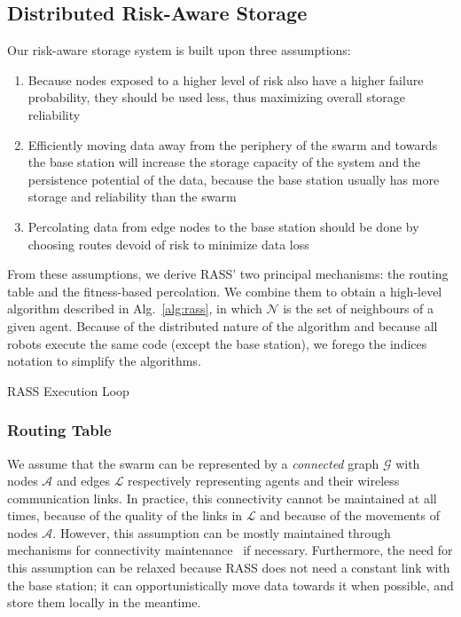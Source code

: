 \subsection{Distributed Risk-Aware Storage}
Our risk-aware storage system is built upon three assumptions:

\begin{enumerate}
\item Because nodes exposed to a higher level of risk also have a higher
  failure probability, they should be used less, thus
  maximizing overall storage reliability
\item Efficiently moving data away from the periphery of the swarm and
  towards the base station will increase the storage capacity of the
  system and the persistence potential of the data, because the base
  station usually has more storage and reliability than the swarm
\item Percolating data from edge nodes to the base station should be
  done by choosing routes devoid of risk to minimize data loss
\end{enumerate}
From these assumptions, we derive \ac{RASS}' two principal mechanisms: the routing table and the fitness-based percolation. We combine them to obtain a high-level algorithm described in Alg.~\ref{alg:rass}, in which $\mathcal{N}$ is the set of neighbours of a given agent. Because of the distributed nature of the algorithm and because all robots execute the same code (except the base station), we forego the indices notation to simplify the algorithms.


\begin{algorithm}[htbp]
\small
\SetAlgoLined
\DontPrintSemicolon
 \caption{\ac{RASS} Execution Loop}
 \label{alg:rass}
\end{algorithm}



\subsubsection{Routing Table}
\label{section:routingTable}
We assume that the swarm can be represented by a
\textit{connected} graph
$\mathcal{G}$ with nodes $\mathcal{A}$ and edges $\mathcal{L}$
respectively representing agents and their wireless communication
links. In practice, this connectivity cannot be maintained at all times, because of the quality of the links in $\mathcal{L}$ and because of the movements of nodes $\mathcal{A}$. However, this assumption can be mostly maintained through mechanisms for connectivity maintenance~\cite{varadharajan2020swarm} if necessary. Furthermore, the need for this assumption can be relaxed because \ac{RASS} does not need a constant link with the base station; it can opportunistically move data towards it when possible, and store them locally in the meantime.

